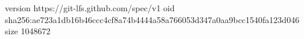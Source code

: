 version https://git-lfs.github.com/spec/v1
oid sha256:ae723a1db16b46ccc4cf8a74b4444a58a766053d347a0aa9bcc1540fa123d046
size 1048672
